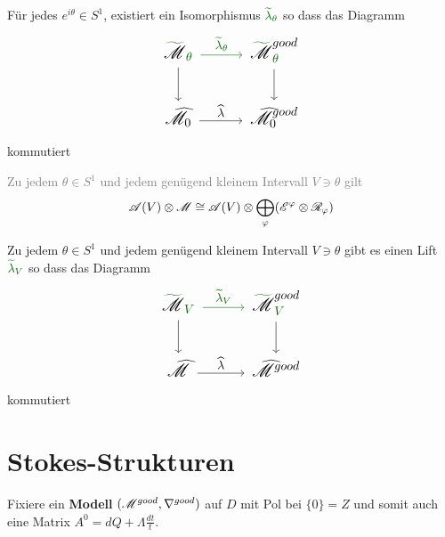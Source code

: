 \begin{paracol}{2} %
  \begin{thm}
    Für jedes $e^{i\theta}\in S^1$, existiert ein Isomorphismus
    $\textcolor{green!40!black}{\tilde\lambda_\theta}$ so dass das Diagramm
    \[ \Large\begin{tikzcd}
        \textcolor{green!40!black}{\tilde{\textcolor{black}{\sM}}_\theta}
        \dar \rar[green!40!black]{\tilde\lambda_\theta}&
        \textcolor{green!40!black}{%
        \tilde{\textcolor{black}{\sM}}_\theta^{\textcolor{black}{good}}}\dar
        \\\hat\sM_0 \rar{\hat\lambda} &
        \hat\sM_0^{good}
    \end{tikzcd} \]
    kommutiert
  \end{thm}
\switchcolumn %
  \begin{thm}
    \textcolor{gray}{%
      Zu jedem $\theta\in S^1$ und jedem genügend kleinem Intervall
      $V\ni\theta$ gilt
      \[
        \mathscr{A}(V)\otimes\mathscr{M}\cong\mathscr{A}(V)\otimes\bigoplus_\varphi(\mathscr{E}^\varphi\otimes\mathscr{R}_\varphi)
      \]
    }
  \end{thm}
\end{paracol} %
\begin{thm}
  Zu jedem $\theta\in S^1$ und jedem genügend kleinem Intervall
  $V\ni\theta$ gibt es einen Lift 
  $\textcolor{green!40!black}{\tilde\lambda_V}$ so dass das Diagramm
  \[ \Large\begin{tikzcd}
      \textcolor{green!40!black}{\tilde{\textcolor{black}{\sM}}_V}
      \dar \rar[green!40!black]{\tilde\lambda_V}&
      \textcolor{green!40!black}{%
        \tilde{\textcolor{black}{\sM}}_V^{\textcolor{black}{good}}}\dar
      \\\hat\sM \rar{\hat\lambda} &
      \hat\sM^{good}
  \end{tikzcd} \]
  kommutiert
\end{thm}
\section{Stokes-Strukturen} %
Fixiere ein \textbf{Modell} $(\mathscr{M}^{good},\nabla^{good})$ auf $D$ mit Pol bei
$\{0\}=Z$ und somit auch eine Matrix $A^0=dQ+\Lambda\frac{dt}{t}$.

